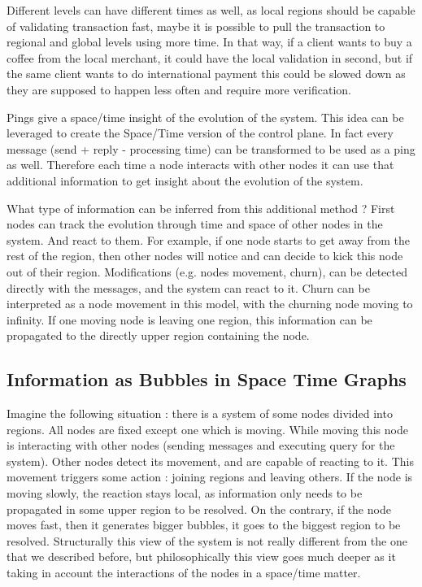 \documentclass[a4paper,11pt,oneside]{report}
\begin{document}
Different levels can have different times as well, as local regions should be
capable of validating transaction fast, maybe it is possible to pull the
transaction to regional and global levels using more time. In that way, if a
client wants to buy a coffee from the local merchant, it could have the local
validation in second, but if the same client wants to do international payment
this could be slowed down as they are supposed to happen less often and require
more verification.

Pings give a space/time insight of the evolution of the system.  This idea can
be leveraged to create the Space/Time version of the control plane. In fact
every message (send + reply - processing time) can be transformed to be used as
a ping as well. Therefore each time a node interacts with other nodes it can
use that additional information to get insight about the evolution of the
system. 

What type of information can be inferred from this additional method ? First
nodes can track the evolution through time and space of other nodes in the
system. And react to them. For example, if one node starts to get away
from the rest of the region, then other nodes will notice and can decide to
kick this node out of their region.
Modifications (e.g. nodes movement, churn), can be detected directly with the
messages, and the system can react to it. Churn can be interpreted as a node
movement in this model, with the churning node moving to infinity. If one
moving node is leaving one region, this information can be propagated to the
directly upper region containing the node. 

\subsection{Information as Bubbles in Space Time Graphs}

Imagine the following situation : there is a system of some nodes divided into
regions. All nodes are fixed except one which is moving. While moving this node
is interacting with other nodes (sending messages and executing query for the
system). Other nodes detect its movement, and are capable of reacting to it.
This movement triggers some action : joining regions and leaving others. If the
node is moving slowly, the reaction stays local, as information only needs to
be propagated in some upper region to be resolved. On the contrary, if the node
moves fast, then it generates bigger bubbles, it goes to the biggest region to
be resolved.  Structurally this view of the system is not really different from
the one that we described before, but philosophically this view goes much
deeper as it taking in account the interactions of the nodes in a space/time
matter. 
\end{document}
